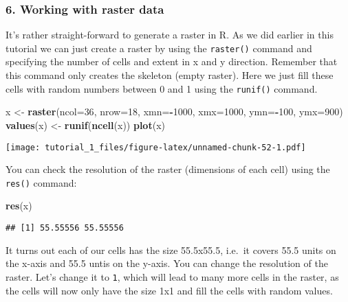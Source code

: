 \documentclass[]{article}
\newenvironment{Shaded}{\begin{snugshade}}{\end{snugshade}}
\newcommand{\DataTypeTok}[1]{\textcolor[rgb]{0.13,0.29,0.53}{#1}}
\newcommand{\DecValTok}[1]{\textcolor[rgb]{0.00,0.00,0.81}{#1}}
\newcommand{\KeywordTok}[1]{\textcolor[rgb]{0.13,0.29,0.53}{\textbf{#1}}}
\newcommand{\NormalTok}[1]{#1}
\newcommand{\OperatorTok}[1]{\textcolor[rgb]{0.81,0.36,0.00}{\textbf{#1}}}
\newcommand{\StringTok}[1]{\textcolor[rgb]{0.31,0.60,0.02}{#1}}
\begin{document}
\hypertarget{working-with-raster-data}{%
\subsubsection{6. Working with raster
data}\label{working-with-raster-data}}

It's rather straight-forward to generate a raster in R. As we did
earlier in this tutorial we can just create a raster by using the
\texttt{raster()} command and specifying the number of cells and extent
in x and y direction. Remember that this command only creates the
skeleton (empty raster). Here we just fill these cells with random
numbers between 0 and 1 using the \texttt{runif()} command.

\begin{Shaded}
\begin{Highlighting}[]
\NormalTok{x <-}\StringTok{ }\KeywordTok{raster}\NormalTok{(}\DataTypeTok{ncol=}\DecValTok{36}\NormalTok{, }\DataTypeTok{nrow=}\DecValTok{18}\NormalTok{, }\DataTypeTok{xmn=}\OperatorTok{-}\DecValTok{1000}\NormalTok{, }\DataTypeTok{xmx=}\DecValTok{1000}\NormalTok{, }\DataTypeTok{ymn=}\OperatorTok{-}\DecValTok{100}\NormalTok{, }\DataTypeTok{ymx=}\DecValTok{900}\NormalTok{)}
\KeywordTok{values}\NormalTok{(x) <-}\StringTok{ }\KeywordTok{runif}\NormalTok{(}\KeywordTok{ncell}\NormalTok{(x))}
\KeywordTok{plot}\NormalTok{(x)}
\end{Highlighting}
\end{Shaded}

\texttt{[image: tutorial\_1\_files/figure-latex/unnamed-chunk-52-1.pdf]}

You can check the resolution of the raster (dimensions of each cell)
using the \texttt{res()} command:

\begin{Shaded}
\begin{Highlighting}[]
\KeywordTok{res}\NormalTok{(x)}
\end{Highlighting}
\end{Shaded}

\begin{verbatim}
## [1] 55.55556 55.55556
\end{verbatim}

It turns out each of our cells has the size 55.5x55.5, i.e.~it covers
55.5 units on the x-axis and 55.5 untis on the y-axis. You can change
the resolution of the raster. Let's change it to \texttt{1}, which will
lead to many more cells in the raster, as the cells will now only have
the size 1x1 and fill the cells with random values.
\end{document}
